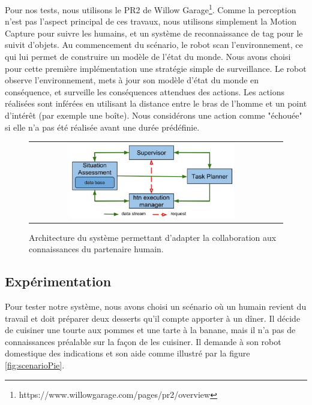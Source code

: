 \documentclass[a4paper,11pt,twoside]{StyleThese}
\begin{document}
Pour nos tests, nous utilisons le PR2 de Willow Garage\footnote{https://www.willowgarage.com/pages/pr2/overview}. Comme la perception n'est pas l'aspect principal de ces travaux, nous utilisons simplement la Motion Capture pour suivre les humains, et un système de reconnaissance de tag pour le suivit d'objets.
Au commencement du scénario, le robot scan l'environnement, ce qui lui permet de construire un modèle de l'état du monde.
Nous avons choisi pour cette première implémentation une stratégie simple de surveillance. Le robot observe l'environnement, mets à jour son modèle d'état du monde en conséquence, et surveille les conséquences attendues des actions. Les actions réalisées sont inférées en utilisant la distance entre le bras de l'homme et un point d'intérêt (par exemple une boîte). Nous considérons une action comme "échouée" si elle n'a pas été réalisée avant une durée prédéfinie.

%
%
%
\begin{figure}[ht!]

 \centering
 \begin{tabular}{cc}
  \includegraphics[width=0.69\textwidth]{img/archi.jpg}
 \end{tabular}
 \caption{Architecture du système permettant d'adapter la collaboration aux connaissances du partenaire humain.}
 \label{fig:architecture}
 \end{figure}
 
 \subsection{Expérimentation}
 \label{sec:experiment}
Pour tester notre système, nous avons choisi un scénario où un humain revient du travail et doit préparer deux desserts qu'il compte apporter à un dîner. Il décide de cuisiner une tourte aux pommes et une tarte à la banane, mais il n'a pas de connaissances préalable sur la façon de les cuisiner. Il demande à son robot domestique des indications et son aide comme illustré par la figure \ref{fig:scenarioPie}.
\end{document}
